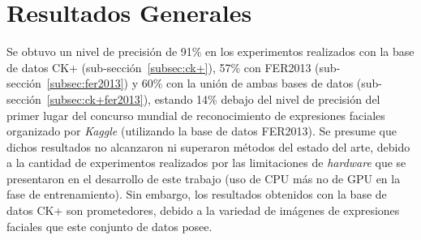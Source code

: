 \chapter*{Resultados Generales}

Se obtuvo un nivel de precisión de 91\% en los experimentos realizados con la base de datos CK+ (sub-sección~\ref{subsec:ck+}), 57\% con FER2013 (sub-sección~\ref{subsec:fer2013}) y 60\% con la unión de ambas bases de datos (sub-sección~\ref{subsec:ck+fer2013}), estando 14\% debajo del nivel de precisión del primer lugar del concurso mundial de reconocimiento de expresiones faciales organizado por \textit{Kaggle} (utilizando la base de datos FER2013). Se presume que dichos resultados no alcanzaron ni superaron métodos del estado del arte, debido a la cantidad de experimentos realizados por las limitaciones de \textit{hardware} que se presentaron en el desarrollo de este trabajo (uso de CPU más no de GPU en la fase de entrenamiento). Sin embargo, los resultados obtenidos con la base de datos CK+ son prometedores, debido a la variedad de imágenes de expresiones faciales  que este conjunto de datos posee.

